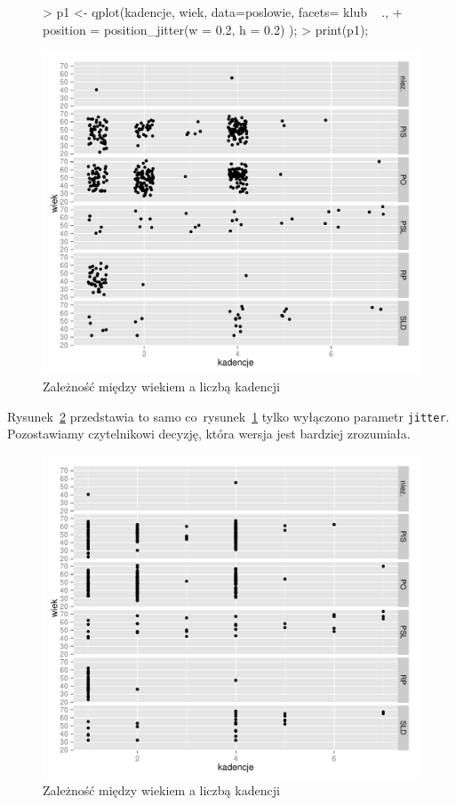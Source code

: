 \documentclass[a4paper]{article}
\begin{document}
\begin{figure}[!tbh]
\begin{Schunk}
\begin{Sinput}
> p1 <- qplot(kadencje, wiek, data=poslowie, facets= klub ~ ., 
+              position = position_jitter(w = 0.2, h = 0.2) );
> print(p1);
\end{Sinput}
\end{Schunk}
\includegraphics{sejm7_wg_stazu_wieku-wiekstazalt}
\caption{Zależność między wiekiem a liczbą kadencji\label{wiekstazalt}}
\end{figure}

Rysunek~\ref{wiekstazaltalt} przedstawia to samo co~rysunek~\ref{wiekstazalt} tylko wyłączono
parametr \texttt{jitter}. Pozostawiamy czytelnikowi decyzję, która wersja jest bardziej zrozumiała.

\begin{figure}[!tbh]
\includegraphics{sejm7_wg_stazu_wieku-wiekstazaltalt}
\caption{Zależność między wiekiem a liczbą kadencji \label{wiekstazaltalt}}
\end{figure}
\end{document}
